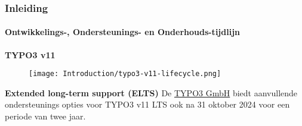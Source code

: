 %

\begin{frame}[fragile]
	\frametitle{Inleiding}
	\framesubtitle{Ontwikkelings-, Ondersteunings- en Onderhouds-tijdlijn}

	\textbf{TYPO3 v11}

	\begin{figure}
		\texttt{[image: Introduction/typo3-v11-lifecycle.png]}
	\end{figure}

	\textbf{Extended long-term support (ELTS)}\newline
	\smaller
		De \href{https://typo3.com}{TYPO3 GmbH} biedt aanvullende ondersteunings
		opties voor TYPO3 v11 LTS ook na 31 oktober 2024 voor een periode van
		twee jaar.
	\normalsize

\end{frame}

